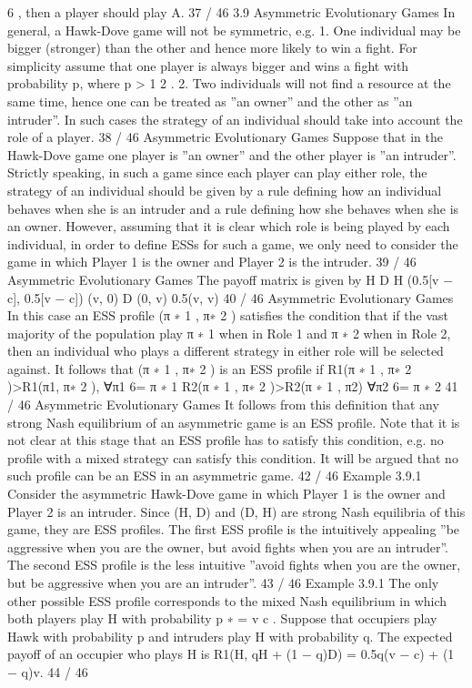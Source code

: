 \documentclass[]{report}
\begin{document}
6
, then a player should play A.
37 / 46
3.9 Asymmetric Evolutionary Games
In general, a Hawk-Dove game will not be symmetric, e.g.
1. One individual may be bigger (stronger) than the
other and hence more likely to win a fight. For
simplicity assume that one player is always bigger and
wins a fight with probability p, where p >
1
2
.
2. Two individuals will not find a resource at the same
time, hence one can be treated as ”an owner” and
the other as ”an intruder”.
In such cases the strategy of an individual should take into account
the role of a player.
38 / 46
Asymmetric Evolutionary Games
Suppose that in the Hawk-Dove game one player is ”an owner”
and the other player is ”an intruder”.
Strictly speaking, in such a game since each player can play either
role, the strategy of an individual should be given by a rule
defining how an individual behaves when she is an intruder and a
rule defining how she behaves when she is an owner.
However, assuming that it is clear which role is being played by
each individual, in order to define ESSs for such a game, we only
need to consider the game in which Player 1 is the owner and
Player 2 is the intruder.
39 / 46
Asymmetric Evolutionary Games
The payoff matrix is given by
H D
H (0.5[v − c], 0.5[v − c]) (v, 0)
D (0, v) 0.5(v, v)
40 / 46
Asymmetric Evolutionary Games
In this case an ESS profile (π
∗
1
, π∗
2
) satisfies the condition that if
the vast majority of the population play π
∗
1 when in Role 1 and π
∗
2
when in Role 2, then an individual who plays a different strategy in
either role will be selected against.
It follows that (π
∗
1
, π∗
2
) is an ESS profile if
R1(π
∗
1
, π∗
2
)>R1(π1, π∗
2
), ∀π1 6= π
∗
1
R2(π
∗
1
, π∗
2
)>R2(π
∗
1
, π2) ∀π2 6= π
∗
2
41 / 46
Asymmetric Evolutionary Games
It follows from this definition that any strong Nash equilibrium of
an asymmetric game is an ESS profile.
Note that it is not clear at this stage that an ESS profile has to
satisfy this condition, e.g. no profile with a mixed strategy can
satisfy this condition. It will be argued that no such profile can be
an ESS in an asymmetric game.
42 / 46
Example 3.9.1
Consider the asymmetric Hawk-Dove game in which Player 1 is the
owner and Player 2 is an intruder.
Since (H, D) and (D, H) are strong Nash equilibria of this game,
they are ESS profiles.
The first ESS profile is the intuitively appealing ”be aggressive
when you are the owner, but avoid fights when you are an
intruder”.
The second ESS profile is the less intuitive ”avoid fights when you
are the owner, but be aggressive when you are an intruder”.
43 / 46
Example 3.9.1
The only other possible ESS profile corresponds to the mixed Nash
equilibrium in which both players play H with probability p
∗ =
v
c
.
Suppose that occupiers play Hawk with probability p and intruders
play H with probability q.
The expected payoff of an occupier who plays H is
R1(H, qH + (1 − q)D) = 0.5q(v − c) + (1 − q)v.
44 / 46
\end{document}
